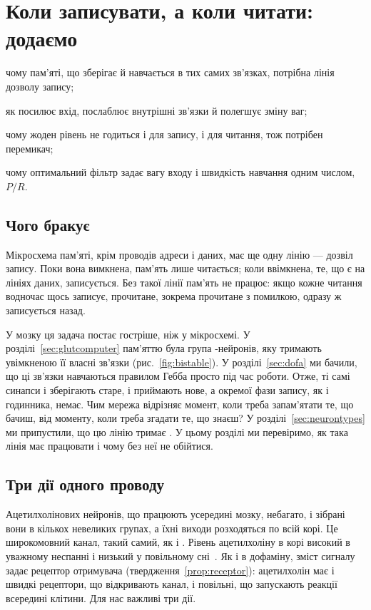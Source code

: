 \chapter{Коли записувати, а коли читати: додаємо }
\label{sec:acet}
\begin{chaptergoals}
\item чому пам'яті, що зберігає й навчається в тих самих зв'язках, потрібна лінія дозволу запису;
\item як  посилює вхід, послаблює внутрішні зв'язки й полегшує зміну ваг;
\item чому жоден рівень  не годиться і для запису, і для читання, тож потрібен перемикач;
\item чому оптимальний фільтр задає вагу входу і швидкість навчання одним числом, $P/R$.
\end{chaptergoals}

\section{Чого бракує}

Мікросхема пам'яті, крім проводів адреси і даних, має ще одну лінію --- дозвіл запису. Поки вона вимкнена, пам'ять лише читається; коли ввімкнена, те, що є на лініях даних, записується. Без такої лінії пам'ять не працює: якщо кожне читання водночас щось записує, прочитане, зокрема прочитане з помилкою, одразу ж записується назад.

У мозку ця задача постає гостріше, ніж у мікросхемі. У розділі~\ref{sec:glutcomputer} пам'яттю була група -нейронів, яку тримають увімкненою її власні зв'язки (рис.~\ref{fig:bistable}). У розділі~\ref{sec:dofa} ми бачили, що ці зв'язки навчаються правилом Гебба просто під час роботи. Отже, ті самі синапси і зберігають старе, і приймають нове, а окремої фази запису, як і годинника, немає. Чим мережа відрізняє момент, коли треба запам'ятати те, що бачиш, від моменту, коли треба згадати те, що знаєш? У розділі~\ref{sec:neurontypes} ми припустили, що цю лінію тримає . У цьому розділі ми перевіримо, як така лінія має працювати і чому без неї не обійтися.

\section{Три дії одного проводу}

Ацетилхолінових нейронів, що працюють усередині мозку, небагато, і зібрані вони в кількох невеликих групах, а їхні виходи розходяться по всій корі. Це широкомовний канал, такий самий, як  і . Рівень ацетилхоліну в корі високий в уважному неспанні і низький у повільному сні~\cite{Hasselmo1999}. Як і в дофаміну, зміст сигналу задає рецептор отримувача (твердження~\ref{prop:receptor}): ацетилхолін має і швидкі рецептори, що відкривають канал, і повільні, що запускають реакції всередині клітини. Для нас важливі три дії.

